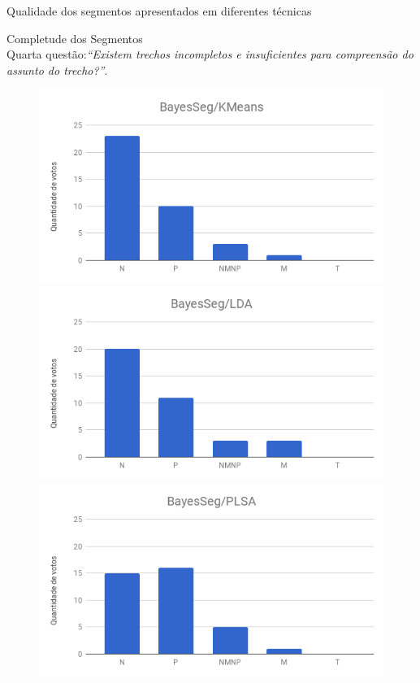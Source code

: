 \documentclass[xcolor=table]{beamer}
\begin{document}
\begin{frame}{Qualidade dos segmentos apresentados em diferentes técnicas}

\center Completude dos Segmentos\\
\tiny Quarta questão:\textit{``Existem trechos incompletos e insuficientes para compreensão do assunto do trecho?''}.%
	\vspace{1cm}

\begin{figure}[!h] \centering     %

		\includegraphics[width=.31\textwidth]{images/figuras-experimento/t1q4.png}
		\includegraphics[width=.31\textwidth]{images/figuras-experimento/t2q4.png}
		\includegraphics[width=.31\textwidth]{images/figuras-experimento/t3q4.png}

	\label{fig:influenciaExtSegQ4}
\end{figure}

\end{frame}






















\end{document}
